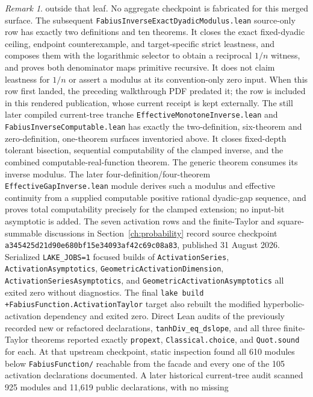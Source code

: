 \documentclass[11pt,oneside]{article}
\theoremstyle{definition}
\theoremstyle{remark}
\newtheorem{remark}[theorem]{Remark}
\begin{document}
\begin{remark}
outside that leaf.  No aggregate checkpoint is fabricated for this merged
surface.
The subsequent \nolinkurl{FabiusInverseExactDyadicModulus.lean} source-only
row has exactly two definitions and ten theorems.  It closes the exact
fixed-dyadic ceiling, endpoint counterexample, and target-specific strict
leastness, and composes them with the logarithmic selector to obtain a
reciprocal \(1/n\) witness, and proves both denominator maps primitive
recursive.  It does not claim leastness for \(1/n\) or assert a modulus at its convention-only zero
input.  When this row first landed, the preceding walkthrough PDF predated it;
the row is included in this rendered publication, whose current receipt is
kept externally.
The still later compiled current-tree tranche
\nolinkurl{EffectiveMonotoneInverse.lean} and
\nolinkurl{FabiusInverseComputable.lean} has exactly the two-definition,
six-theorem and zero-definition, one-theorem surfaces inventoried above.  It
closes fixed-depth tolerant bisection, sequential computability of the
clamped inverse, and the combined computable-real-function theorem.  The
generic theorem consumes its inverse modulus.  The later
four-definition/four-theorem \nolinkurl{EffectiveGapInverse.lean} module
derives such a modulus and
effective continuity from a supplied computable positive rational dyadic-gap
sequence, and proves total computability precisely for the clamped extension;
no input-bit asymptotic is added.
The seven activation rows and the finite-Taylor and square-summable discussions in
Section~\ref{ch:probability} record source checkpoint
\nolinkurl{a345425d21d90e680bf15e34093af42c69c08a83}, published 31 August
2026.  Serialized \nolinkurl{LAKE_JOBS=1} focused builds of
\nolinkurl{ActivationSeries}, \nolinkurl{ActivationAsymptotics},
\nolinkurl{GeometricActivationDimension},
\nolinkurl{ActivationSeriesAsymptotics}, and
\nolinkurl{GeometricActivationAsymptotics} all exited zero without diagnostics.
The final \nolinkurl{lake build +FabiusFunction.ActivationTaylor} target also
rebuilt the modified hyperbolic-activation dependency and exited zero.  Direct
Lean audits of the previously recorded new or refactored declarations,
\nolinkurl{tanhDiv_eq_dslope}, and all three finite-Taylor theorems reported exactly
\nolinkurl{propext}, \nolinkurl{Classical.choice}, and \nolinkurl{Quot.sound}
for each.  At that upstream checkpoint, static inspection found all 610 modules
below \nolinkurl{FabiusFunction/} reachable from the facade and every one of
the 105 activation declarations documented.  A later historical current-tree
audit scanned 925 modules and 11,619 public declarations, with no missing

\end{remark}
\end{document}
